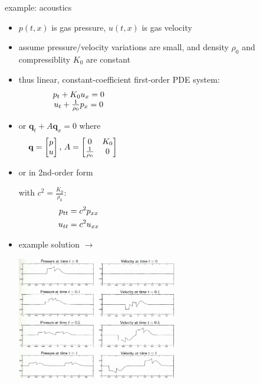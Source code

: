 \documentclass[10pt,dvipsnames,usepdftitle=false,
hyperref={pdftitle = {Finite volume methods},
    pdfauthor = {Ed Bueler}}]{beamer}
\newcommand{\bq}{\mathbf{q}}
\begin{document}
\begin{frame}{example: acoustics}

\begin{itemize}
\item $p(t,x)$ is gas pressure, $u(t,x)$ is gas velocity
\item assume pressure/velocity variations are small, and density $\rho_0$ and compressiblity $K_0$ are constant
\item thus linear, constant-coefficient first-order PDE system:
$$\begin{matrix} p_t + K_0 u_x = 0 \\ u_t + \frac{1}{\rho_0} p_x = 0 \end{matrix} \hspace{70mm}$$
\item or $\bq_t + A \bq_x=0$ where
$$\bq = \begin{bmatrix} p \\ u \end{bmatrix}, \, A = \begin{bmatrix} 0 & K_0 \\ \frac{1}{\rho_0} & 0 \end{bmatrix} \hspace{75mm}$$
\item or in 2nd-order form

with $c^2 = \frac{K_0}{\rho_0}$:
\begin{align*}
p_{tt} &= c^2 p_{xx} \hspace{70mm} \\
u_{tt} &= c^2 u_{xx}
\end{align*}
\item example solution $\longrightarrow$

\vspace{-60mm}
\hfill \includegraphics[width=0.55\textwidth]{figs/leveque3p1}
\end{itemize}
\end{frame}
\end{document}
